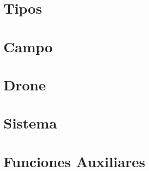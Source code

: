 \documentclass[a4paper]{article}
\begin{document}

\section{Tipos}



\section{Campo}





\newpage

\section{Drone}





\newpage

\section{Sistema}





%

\newpage

\section{Funciones Auxiliares}


\end{document}
